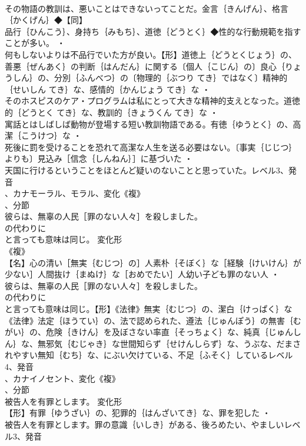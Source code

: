 \documentclass[8pt]{extreport}
\begin{document}
\begin{CJK}{UTF8}{min}
\\	その物語の教訓は、悪いことはできないってことだ。金言｛きんげん｝、格言｛かくげん｝◆【同】
\\	品行｛ひんこう｝、身持ち｛みもち｝、道徳｛どうとく｝◆性的な行動規範を指すことが多い。 ・
\\	何もしないよりは不品行でいた方が良い。【形】道徳上｛どうとくじょう｝の、善悪｛ぜんあく｝の判断｛はんだん｝に関する〔個人｛こじん｝の〕良心｛りょうしん｝の、分別｛ふんべつ｝の〔物理的｛ぶつり てき｝ではなく〕精神的｛せいしん てき｝な、感情的｛かんじょう てき｝な ・
\\	そのホスピスのケア・プログラムは私にとって大きな精神的支えとなった。道徳的｛どうとく てき｝な、教訓的｛きょうくん てき｝な ・
\\	寓話とはしばしば動物が登場する短い教訓物語である。有徳｛ゆうとく｝の、高潔｛こうけつ｝な ・
\\	死後に罰を受けることを恐れて高潔な人生を送る必要はない。〔事実｛じじつ｝よりも〕見込み［信念｛しんねん｝］に基づいた ・
\\	天国に行けるということをほとんど疑いのないことと思っていた。レベル3、発音
\\	、カナモーラル、モラル、変化《複》
\\	、分節
\\	彼らは、無辜の人民［罪のない人々］を殺しました。
\\	の代わりに
\\	と言っても意味は同じ。	変化形 
\\	《複》
\\	【名】心の清い［無実｛むじつ｝の］人素朴｛そぼく｝な［経験｛けいけん｝が少ない］人間抜け｛まぬけ｝な［おめでたい］人幼い子ども罪のない人 ・
\\	彼らは、無辜の人民［罪のない人々］を殺しました。
\\	の代わりに
\\	と言っても意味は同じ。【形】《法律》無実｛むじつ｝の、潔白｛けっぱく｝な《法律》法定｛ほうてい｝の、法で認められた、遵法｛じゅんぽう｝の無害｛むがい｝の、危険｛きけん｝を及ぼさない率直｛そっちょく｝な、純真｛じゅんしん｝な、無邪気｛むじゃき｝な世間知らず｛せけんしらず｝な、うぶな、だまされやすい無知｛むち｝な、にぶい欠けている、不足｛ふそく｝しているレベル4、発音
\\	、カナイノセント、変化《複》
\\	、分節
\\	被告人を有罪とします。	変化形 
\\	【形】有罪｛ゆうざい｝の、犯罪的｛はんざいてき｝な、罪を犯した ・
\\	被告人を有罪とします。罪の意識｛いしき｝がある、後ろめたい、やましいレベル3、発音

\end{CJK}
\end{document}
